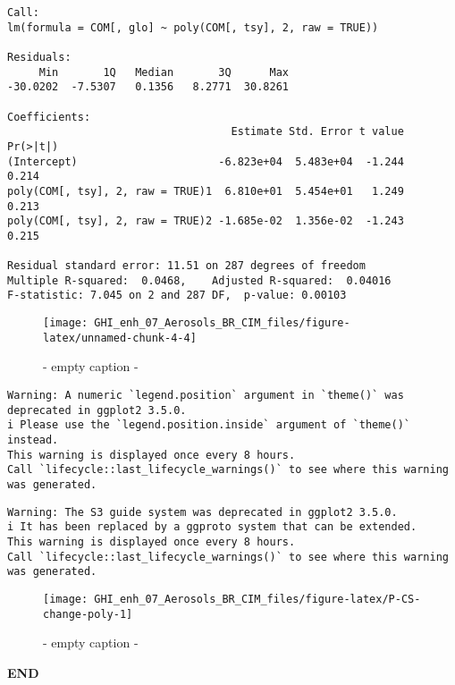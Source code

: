 \documentclass[
  10pt,
  a4paper,oneside]{article}
\begin{document}
\begin{verbatim}
Call:
lm(formula = COM[, glo] ~ poly(COM[, tsy], 2, raw = TRUE))

Residuals:
     Min       1Q   Median       3Q      Max 
-30.0202  -7.5307   0.1356   8.2771  30.8261 

Coefficients:
                                   Estimate Std. Error t value Pr(>|t|)
(Intercept)                      -6.823e+04  5.483e+04  -1.244    0.214
poly(COM[, tsy], 2, raw = TRUE)1  6.810e+01  5.454e+01   1.249    0.213
poly(COM[, tsy], 2, raw = TRUE)2 -1.685e-02  1.356e-02  -1.243    0.215

Residual standard error: 11.51 on 287 degrees of freedom
Multiple R-squared:  0.0468,    Adjusted R-squared:  0.04016 
F-statistic: 7.045 on 2 and 287 DF,  p-value: 0.00103
\end{verbatim}

\begin{figure}[H]

{\centering \texttt{[image: GHI\_enh\_07\_Aerosols\_BR\_CIM\_files/figure-latex/unnamed-chunk-4-4]} 

}

\caption{ - empty caption - }\label{fig:unnamed-chunk-4-4}
\end{figure}

\begin{verbatim}
Warning: A numeric `legend.position` argument in `theme()` was deprecated in ggplot2 3.5.0.
i Please use the `legend.position.inside` argument of `theme()` instead.
This warning is displayed once every 8 hours.
Call `lifecycle::last_lifecycle_warnings()` to see where this warning was generated.
\end{verbatim}

\begin{verbatim}
Warning: The S3 guide system was deprecated in ggplot2 3.5.0.
i It has been replaced by a ggproto system that can be extended.
This warning is displayed once every 8 hours.
Call `lifecycle::last_lifecycle_warnings()` to see where this warning was generated.
\end{verbatim}

\begin{figure}[H]

{\centering \texttt{[image: GHI\_enh\_07\_Aerosols\_BR\_CIM\_files/figure-latex/P-CS-change-poly-1]} 

}

\caption{ - empty caption - }\label{fig:P-CS-change-poly}
\end{figure}

\textbf{END}
\end{document}
